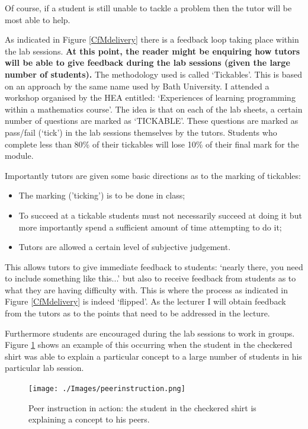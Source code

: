 \documentclass{article}
\begin{document}
Of course, if a student is still unable to tackle a problem then the tutor will be most able to help.

As indicated in Figure \ref{CfMdelivery} there is a feedback loop taking place within the lab sessions. \textbf{At this point, the reader might be enquiring how tutors will be able to give feedback during the lab sessions (given the large number of students).} The methodology used is called `Tickables'. This is based on an approach by the same name used by Bath University. I attended a workshop organised by the HEA entitled: `Experiences of learning programming within a mathematics course'. The idea is that on each of the lab sheets, a certain number of questions are marked as `TICKABLE'. These questions are marked as pass/fail (`tick') in the lab sessions themselves by the tutors. Students who complete less than 80\% of their tickables will lose 10\% of their final mark for the module.

Importantly tutors are given some basic directions as to the marking of tickables:

\begin{itemize}
    \item The marking ('ticking') is to be done in class;
    \item To succeed at a tickable students must not necessarily succeed at doing it but more importantly spend a sufficient amount of time attempting to do it;
    \item Tutors are allowed a certain level of subjective judgement.
\end{itemize}

This allows tutors to give immediate feedback to students: `nearly there, you need to include something like this...' but also to receive feedback from students as to what they are having difficulty with. This is where the process as indicated in Figure \ref{CfMdelivery} is indeed `flipped'. As the lecturer I will obtain feedback from the tutors as to the points that need to be addressed in the lecture.

Furthermore students are encouraged during the lab sessions to work in groups. Figure \ref{peerinstruction} shows an example of this occurring when the student in the checkered shirt was able to explain a particular concept to a large number of students in his particular lab session.

\begin{figure}[htdp]
\begin{center}
\texttt{[image: ./Images/peerinstruction.png]}
\end{center}
\caption{Peer instruction in action: the student in the checkered shirt is explaining a concept to his peers.}\label{peerinstruction}
\end{figure}
\end{document}
